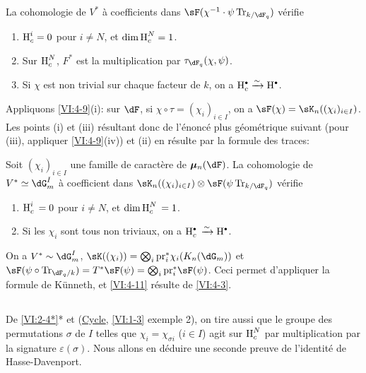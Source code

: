 \begin{proposition_}\label{VI:4-10}
La cohomologie de $V^\ast$ à coefficients dans 
$\sF(\chi^{-1}\cdot \psi\tr_{k/\dF_q})$ vérifie 
\begin{enumerate}[\indent (i)]
  \item $\operatorname{H}_c^i = 0$ pour $i\ne N$, et $\dim \operatorname{H}_c^N=1$. 
  \item Sur $\operatorname{H}_c^N$, $F^\ast$ est la multiplication par 
    $\tau_{\dF_q}(\chi,\psi)$. 
  \item Si $\chi$ est non trivial sur chaque facteur de $k$, on a 
    $\h_c^\bullet \iso \h^\bullet$. 
\end{enumerate}
\end{proposition_}

Appliquons \ref{VI:4-9}(i): sur $\dF$, si $\chi\circ \tau=(\chi_i)_{i\in I}$, 
on a $\sF(\chi) = \sK_n((\chi_i)_{i\in I})$. Les points (i) et (iii) 
résultant donc de l'énoncé plus géométrique suivant (pour (iii), 
appliquer \ref{VI:4-9}(iv)) et (ii) en résulte par la formule des traces: 





\begin{proposition_}\label{VI:4-11}
Soit $(\chi_i)_{i\in I}$ une famille de caractère de $\dmu_n(\dF)$. La 
cohomologie de $V^\ast\simeq \dG_m^I$ à coefficient dans 
$\sK_n((\chi_i)_{i\in I})\otimes \sF(\psi\tr_{k/\dF_q})$ vérifie 
\begin{enumerate}[\indent (i)]
  \item $\operatorname{H}_c^i{}=0$ pour $i\ne N$, et $\dim \operatorname{H}_c^N{} = 1$. 
  \item Si les $\chi_i$ sont tous non triviaux, on a 
    $\h_c^\bullet{}\iso \h^\bullet$. 
\end{enumerate}
\end{proposition_}

On a $V^\ast\sim \dG_m^I$, 
$\sK((\chi_i)) = \bigotimes_i \pr_i^\ast \chi_i(K_n(\dG_m))$ et 
$\sF(\psi\circ \tr_{\dF_q/k})=T^\ast \sF(\psi) = \bigotimes_i \pr_i^\ast \sF(\psi)$. 
Ceci permet d'appliquer la formule de K\"unneth, et \ref{VI:4-11} résulte de 
\ref{VI:4-3}. 





\subsection{}\label{VI:4-12}

De \ref{VI:2-4*}* et (\hyperref[VI]{Cycle}, \ref{VI:1-3} exemple 2), on tire 
aussi que le groupe des permutations $\sigma$ de $I$ telles que 
$\chi_i = \chi_{\sigma i}$ ($i\in I$) agit sur $\operatorname{H}_c^N$ par multiplication par 
la signature $\varepsilon(\sigma)$. Nous allons en déduire une seconde preuve 
de l'identité de Hasse-Davenport. 

